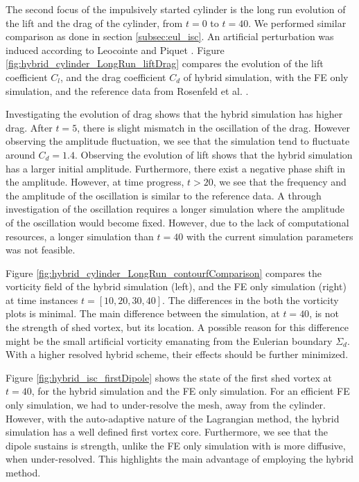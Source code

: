 The second focus of the impulsively started cylinder is the long run evolution of the lift and the drag of the cylinder, from $t=0$ to $t=40$. We performed similar comparison as done in section \ref{subsec:eul_isc}. An artificial perturbation was induced according to Leocointe and Piquet \cite{Lecointe1984}. Figure \ref{fig:hybrid_cylinder_LongRun_liftDrag} compares the evolution of the lift coefficient $C_l$, and the drag coefficient $C_d$ of hybrid simulation, with the FE only simulation, and the reference data from Rosenfeld et al. \cite{MosheRosenFeldDochanKwak1991}. 

Investigating the evolution of drag shows that the hybrid simulation has higher drag. After $t=5$, there is slight mismatch in the oscillation of the drag. However observing the amplitude fluctuation, we see that the simulation tend to fluctuate around $C_d=1.4$. Observing the evolution of lift shows that the hybrid simulation has a larger initial amplitude. Furthermore, there exist a negative phase shift in the amplitude. However, at time progress, $t>20$, we see that the frequency and the amplitude of the oscillation is similar to the reference data. A through investigation of the oscillation requires a longer simulation where the amplitude of the oscillation would become fixed. However, due to the lack of computational resources, a longer simulation than $t=40$ with the current simulation parameters was not feasible.

Figure \ref{fig:hybrid_cylinder_LongRun_contourfComparison} compares the vorticity field of the hybrid simulation (left), and the FE only simulation (right) at time instances $t=[10,20,30,40]$. The differences in the both the vorticity plots is minimal. The main difference between the simulation, at $t=40$, is not the strength of shed vortex, but its location. A possible reason for this difference might be the small artificial vorticity emanating from the Eulerian boundary $\Sigma_d$. With a higher resolved hybrid scheme, their effects should be further minimized.

Figure \ref{fig:hybrid_isc_firstDipole}	shows the state of the first shed vortex at $t=40$, for the hybrid simulation and the FE only simulation. For an efficient FE only simulation, we had to under-resolve the mesh, away from the cylinder. However, with the auto-adaptive nature of the Lagrangian method, the hybrid simulation has a well defined first vortex core. Furthermore, we see that the dipole sustains is strength, unlike the FE only simulation with is more diffusive, when under-resolved. This highlights the main advantage of employing the hybrid method.
	
